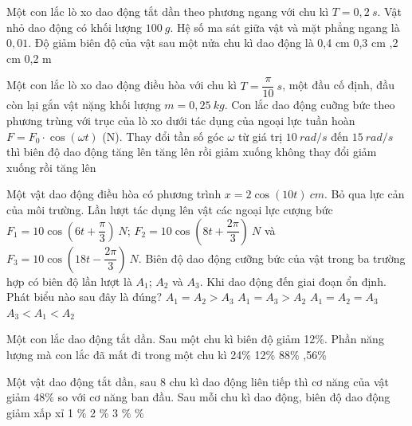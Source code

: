 \begin{ex}
Một con lắc lò xo dao động tắt dần theo phương ngang với chu kì $T = 0,2\  s$. Vật nhỏ dao động có khối lượng $100\ g$. Hệ số ma sát giữa vật và mặt phẳng ngang là $0,01$. Độ giảm biên độ của vật sau một nửa chu kì dao động là
\choice
{0,4 cm}
{0,3 cm}
{,2 cm}
{0,2 m}
\loigiai{}
\end{ex}
\begin{ex}
Một con lắc lò xo dao động điều hòa với chu kì $T = \dfrac{\pi}{10}\ s$, một đầu cố định, đầu còn lại gắn vật nặng khối lượng $m = 0,25\ kg$. Con lắc dao động cuỡng bức theo phương trùng với trục của lò xo dưới tác dụng của ngoại lực tuần hoàn $F = F_{0} \cdot \cos (\omega t)$ (N). Thay đổi tần số góc $\omega$ từ giá trị $10\ rad/s$ đến $15\ rad/s$ thì biên độ dao động
\choice
{\True tăng lên}
{tăng lên rồi giảm xuống}
{không thay đổi}
{giảm xuống rồi tăng lên}
\loigiai{}
\end{ex}
\begin{ex}
Một vật dao động điều hòa có phương trình $x = 2 \cos (10 t)\ cm$. Bỏ qua lực cản của môi trường. Lần lượt tác dụng lên vật các ngoại lực cượng bức $F_{1} = 10\cos \left(6t + \dfrac{\pi}{3}\right)\ N$; $F_{2} = 10\cos \left(8 t + \dfrac{2 \pi}{3}\right)\ N$ và $F_{3} = 10\cos \left(18t - \dfrac{2 \pi}{3}\right)\ N$. Biên độ dao động cưỡng bức của vật
trong ba trường hợp có biên độ lần lượt là $A_{1}$; $A_{2}$ và $A_{3}$. Khi dao động đến giai đoạn ổn định. Phát biểu nào sau đây là đúng?
\choice
{$A_{1} = A_{2} > A_{3}$}
{$A_{1} = A_{3} > A_{2}$}
{$A_{1} = A_{2} = A_{3}$}
{\True $A_{3} < A_{1} < A_{2}$}
\loigiai{}
\end{ex}
\begin{ex}%
Một con lắc dao động tắt dần. Sau một chu kì biên độ giảm 12\%. Phần năng lượng mà con lắc đã mất đi trong một chu kì
\choice
{24\%}
{12\%}
{88\%}
{,56\%}
\end{ex} 
\begin{ex}
Một vật dao động tắt dần, sau 8 chu kì dao động liên tiếp thì cơ năng của vật giảm $48 \%$ so với cơ năng ban đầu. Sau mỗi chu kì dao động, biên độ dao động giảm xấp xỉ
\choice
{1 \%}
{2 \%}
{3 \%}
{ \%}
\loigiai{}
\end{ex}
